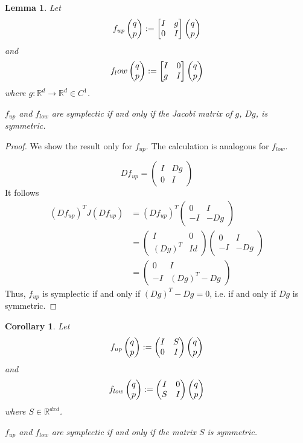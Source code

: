 \documentclass[twoside,a4paper]{article}
\newtheorem{corollary}{Corollary}
\newtheorem{lemma}{Lemma}
\begin{document}

\begin{lemma}\label{jacobi_symmetric}
	Let
	\begin{equation*}
		f_{up} \begin{pmatrix} q \\ p \end{pmatrix} := \begin{bmatrix} I & {g} \\ 0 & I \end{bmatrix} \begin{pmatrix} q \\ p \end{pmatrix}
	\end{equation*}
	and
	\begin{equation*}
		f_low \begin{pmatrix} q \\ p \end{pmatrix} := \begin{bmatrix} I & 0 \\ {g} & I \end{bmatrix} \begin{pmatrix} q \\ p \end{pmatrix}
	\end{equation*}
	where $g: \mathbb{R}^d \rightarrow \mathbb{R}^d \in C^1$. 

	$f_{up}$ and $f_{low}$ are symplectic if and only if the Jacobi matrix of $g$, $Dg$,
	is symmetric.
\end{lemma}
\begin{proof}
	We show the result only for $f_{up}$. The calculation is analogous for $f_{low}$.

	\begin{equation*}
		Df_{up} = \begin{pmatrix}
			I & Dg \\
			0 & I
		\end{pmatrix}
	\end{equation*}
	It follows
	\begin{align*}
		\left(Df_{up}\right)^TJ(Df_{up}) &= \left(Df_{up}\right)^T \begin{pmatrix}
			0 & I \\
			-I & -Dg
		\end{pmatrix} \\
		&= \begin{pmatrix}
			I & 0 \\
			(Dg)^T & Id
		\end{pmatrix} \begin{pmatrix}
			0 & I \\
			-I & -Dg
		\end{pmatrix} \\
		&= \begin{pmatrix}
			0 & I \\
			-I & (Dg)^T-Dg
		\end{pmatrix}
	\end{align*}
	Thus, $f_{up}$ is symplectic if and only if $(Dg)^T-Dg=0$, i.e. if and only if $Dg$
	is symmetric.
\end{proof}

\begin{corollary}\label{matrix_symmetric}
	Let
	\begin{equation*}
		f_{up} \begin{pmatrix} q \\ p \end{pmatrix} := \begin{pmatrix}
			I & S \\
			0 & I
		\end{pmatrix} \begin{pmatrix} q \\ p \end{pmatrix}
	\end{equation*}
	and
	\begin{equation*}
		f_{low} \begin{pmatrix} q \\ p \end{pmatrix} := \begin{pmatrix}
			I & 0 \\
			S & I
		\end{pmatrix} \begin{pmatrix} q \\ p \end{pmatrix}
	\end{equation*}
	where $S \in \mathbb{R}^{dxd}$. 

	$f_{up}$ and $f_{low}$ are symplectic if and only if the matrix $S$
	is symmetric.
\end{corollary}
\end{document}
